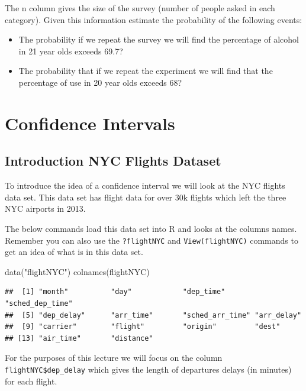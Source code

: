 \documentclass[
]{book}
\newenvironment{Shaded}{\begin{snugshade}}{\end{snugshade}}
\newcommand{\FunctionTok}[1]{\textcolor[rgb]{0.00,0.00,0.00}{#1}}
\newcommand{\NormalTok}[1]{#1}
\newcommand{\StringTok}[1]{\textcolor[rgb]{0.31,0.60,0.02}{#1}}
\providecommand{\tightlist}{%
  \setlength{\itemsep}{0pt}\setlength{\parskip}{0pt}}
\theoremstyle{definition}
\theoremstyle{definition}
\theoremstyle{definition}
\theoremstyle{definition}
\theoremstyle{remark}
\begin{document}
The n column gives the size of the survey (number of people asked in each category). Given this information estimate the probability of the following events:

\begin{itemize}
\tightlist
\item
  The probability if we repeat the survey we will find the percentage of alcohol in 21 year olds exceeds 69.7?
\item
  The probability that if we repeat the experiment we will find that the percentage of use in 20 year olds exceeds 68?
\end{itemize}

\hypertarget{confidence-intervals}{%
\chapter{Confidence Intervals}\label{confidence-intervals}}

\hypertarget{introduction-nyc-flights-dataset}{%
\section{Introduction NYC Flights Dataset}\label{introduction-nyc-flights-dataset}}

To introduce the idea of a confidence interval we will look at the NYC flights data set. This data set has flight data for over 30k flights which left the three NYC airports in 2013.

The below commands load this data set into R and looks at the columns names. Remember you can also use the \texttt{?flightNYC} and \texttt{View(flightNYC)} commands to get an idea of what is in this data set.

\begin{Shaded}
\begin{Highlighting}[]
\FunctionTok{data}\NormalTok{(}\StringTok{"flightNYC"}\NormalTok{)}
\FunctionTok{colnames}\NormalTok{(flightNYC)}
\end{Highlighting}
\end{Shaded}

\begin{verbatim}
##  [1] "month"          "day"            "dep_time"       "sched_dep_time"
##  [5] "dep_delay"      "arr_time"       "sched_arr_time" "arr_delay"     
##  [9] "carrier"        "flight"         "origin"         "dest"          
## [13] "air_time"       "distance"
\end{verbatim}

For the purposes of this lecture we will focus on the column \texttt{flightNYC\$dep\_delay} which gives the length of departures delays (in minutes) for each flight.
\end{document}
